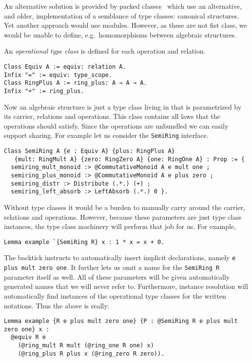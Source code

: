 \documentclass[a4paper,10pt,runningheads]{llncs}
\begin{document}
An alternative solution is provided by packed classes~\cite{packed} which use an alternative, and older, implementation of a semblance of type classes: canonical structures. Yet another approach would use modules. However, as these are not fist class, we would be unable to define, e.g.\ homomorphisms between algebraic structures.

An \emph{operational type class} is defined for each operation and relation.
\begin{lstlisting}
Class Equiv A := equiv: relation A.
Infix "=" := equiv: type_scope.
Class RingPlus A := ring_plus: A → A → A.
Infix "+" := ring_plus.
\end{lstlisting}
Now an algebraic structure is just a type class living in \prop{} that is parametrized by its carrier, relations and operations. This class contains all laws that the operations should satisfy. Since the operations are unbundled we can easily support sharing. For example let us consider the \lstinline|SemiRing| interface.
\begin{lstlisting}
Class SemiRing A {e : Equiv A} {plus: RingPlus A} 
   {mult: RingMult A} {zero: RingZero A} {one: RingOne A} : Prop := { 
  semiring_mult_monoid :> @CommutativeMonoid A e mult one ;
  semiring_plus_monoid :> @CommutativeMonoid A e plus zero ;
  semiring_distr :> Distribute (.*.) (+) ;
  semiring_left_absorb :> LeftAbsorb (.*.) 0 }.
\end{lstlisting}   
Without type classes it would be a burden to manually carry around the carrier, relations and operations. However, because these parameters are just type class instances, the type class machinery will perform that job for us. For example,
\begin{lstlisting}
Lemma example `{SemiRing R} x : 1 * x = x + 0.
\end{lstlisting}
The backtick instructs \Coq{} to automatically insert implicit declarations, namely \lstinline|e plus mult zero one|. It further lets us omit a name for the \lstinline|SemiRing R| parameter itself as well. All of these parameters will be given automatically generated names that we will never refer to. Furthermore, instance resolution will automatically find instances of the operational type classes for the written notations. Thus the above is really:
\begin{lstlisting}
Lemma example {R e plus mult zero one} {P : @SemiRing R e plus mult zero one} x : 
  @equiv R e 
    (@ring_mult R mult (@ring_one R one) x) 
    (@ring_plus R plus x (@ring_zero R zero)).
\end{lstlisting}
\end{document}
